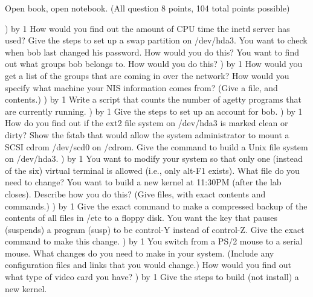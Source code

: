 
\parindent=0in
\nopagenumbers
\newcount\quesno
{}
\def\ques{\number\quesno) \advance\quesno by 1}
\def\aspace{\vskip 1.5in}

Open book, open notebook. (All question 8 points, 104 total points possible)

\ques
How would you find out the amount of CPU time the {\ltt{}inetd}
server has used?
\vskip 0.8in
Give the steps to set up a swap partition on {\ltt{}/dev/hda3}.
\vskip 1.3in
You want to check when {\ltt{}bob} last changed his password.
How would you do this?
\vskip 1.0in
You want to find out what groups {\ltt{}bob} belongs to.
How would you do this?
\vskip 0.8in
\ques
How would you get a list of the groups that are 
coming in over the network?
\vskip 0.8in
How would you specify what machine your NIS information comes from?
(Give a file, and contents.)
\vskip 0.5in
\ques
Write a script that counts the number of {\ltt{}agetty} programs
that are currently running.
\vfill\eject
\ques
Give the steps to set up an account for {\ltt{}bob}.
\vskip 2.0in
\ques
How do you find out if the ext2 file system on {\ltt{}/dev/hda3} is
marked clean or dirty?
\vskip 1.0in
Show the {\ltt{}fstab} that would allow the system administrator
to mount a SCSI cdrom {\ltt{}/dev/scd0} on {\ltt{}/cdrom}.
\vskip 0.7in
Give the command to build a Unix file system on {\ltt{}/dev/hda3}.
\vskip 0.7in
\ques
You want to modify your system so that only one
(instead of the six) virtual terminal is allowed (i.e., only alt-F1 exists).
What file do you need to change?
\vskip 0.5in
You want to build a new kernel at 11:30PM (after the lab closes).
Describe how you do this? (Give files, with exact contents and commands.)
\vfill\eject
\ques
Give the exact command to 
make a compressed backup of the contents of all files in
{\ltt{}/etc} to a floppy disk.
\vskip 1.0in
You want the key that pauses (suspends) a program ({\ltt{}susp}) to
be control-Y instead of control-Z.
Give the exact command to make this change.
\vskip 0.5in
\ques
You switch from a PS/2 mouse to a serial mouse.
What changes do you need to make in your system.
(Include any configuration files and links that you would change.)
\vskip 1.1in
How would you find out what type of video card you have?
\vskip 0.7in
\ques
Give the steps to build (not install) a new kernel.
\vskip 1.8in
